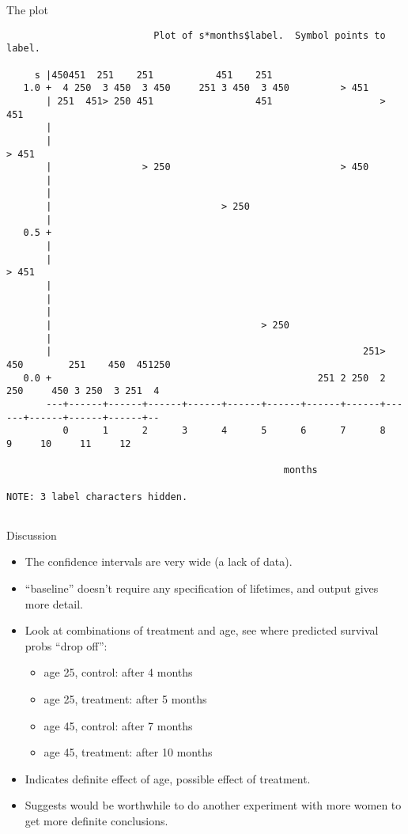 \documentclass[pdf]{prosper}
\begin{document}
\begin{slide}{The plot}

{\tiny
\begin{verbatim}
                          Plot of s*months$label.  Symbol points to label.

     s |450451  251    251           451    251
   1.0 +  4 250  3 450  3 450     251 3 450  3 450         > 451
       | 251  451> 250 451                  451                   > 451
       |
       |                                                                        > 451
       |                > 250                              > 450
       |
       |
       |                              > 250
       |
   0.5 +
       |
       |                                                                               > 451
       |
       |
       |
       |                                     > 250
       |
       |                                                       251> 450        251    450  451250
   0.0 +                                               251 2 250  2 250     450 3 250  3 251  4
       ---+------+------+------+------+------+------+------+------+------+------+------+------+--
          0      1      2      3      4      5      6      7      8      9     10     11     12

                                                 months

NOTE: 3 label characters hidden.


\end{verbatim}
}
  
\end{slide}

\begin{slide}{Discussion}

  \begin{itemize}
  \item The confidence intervals are very wide (a lack of data).
  \item ``baseline'' doesn't require any specification of lifetimes, and output gives more detail.
  \item Look at combinations of treatment and age, see where predicted survival probs ``drop off'':
    \begin{itemize}
    \item age 25, control: after 4 months
    \item age 25, treatment: after 5 months
    \item age 45, control:  after 7 months
    \item age 45, treatment: after 10 months
    \end{itemize}
  \item Indicates definite effect of age, possible effect of treatment.
  \item Suggests would be worthwhile to do another experiment with more women to get more definite conclusions.
  \end{itemize}
  
\end{slide}
\end{document}
